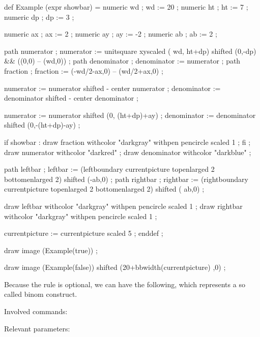 \startlinecorrection
\startMPcode
    def Example (expr showbar) =
        numeric wd ; wd := 20 ;
        numeric ht ; ht :=  7 ;
        numeric dp ; dp :=  3 ;

        numeric ax ; ax :=  2 ;
        numeric ay ; ay := -2 ;
        numeric ab ; ab :=  2 ;

        path numerator   ; numerator   := unitsquare xyscaled ( wd, ht+dp) shifted (0,-dp) && ((0,0) -- (wd,0)) ;
        path denominator ; denominator := numerator ;
        path fraction    ; fraction    := (-wd/2-ax,0) -- (wd/2+ax,0) ;

        numerator   := numerator   shifted - center numerator ;
        denominator := denominator shifted - center denominator ;

        numerator   := numerator   shifted (0, (ht+dp)+ay) ;
        denominator := denominator shifted (0,-(ht+dp)-ay) ;

        if showbar :
            draw fraction    withcolor "darkgray" withpen pencircle scaled 1 ;
        fi ;
        draw numerator   withcolor "darkred"  ;
        draw denominator withcolor "darkblue" ;

        path leftbar  ; leftbar  := (leftboundary  currentpicture topenlarged 2 bottomenlarged 2) shifted (-ab,0) ;
        path rightbar ; rightbar := (rightboundary currentpicture topenlarged 2 bottomenlarged 2) shifted ( ab,0) ;

        draw leftbar  withcolor "darkgray" withpen pencircle scaled 1 ;
        draw rightbar withcolor "darkgray" withpen pencircle scaled 1 ;

        currentpicture := currentpicture scaled 5 ;
    enddef ;

    draw image (Example(true)) ;

    draw image (Example(false)) shifted (20+bbwidth(currentpicture) ,0) ;

\stopMPcode
\stoplinecorrection

Because the rule is optional, we can have the following, which represents a so
called binom construct.

Involved commands:

\starttyping
\Uabove
\Uatop
\Uover
\Ustretched
\Uabovewithdelims
\Uatopwithdelims
\Uoverwithdelims
\Ustretchedwithdelims
\stoptyping

Relevant parameters:

\starttyping
\Umathfractionrule
\Umathfractionnumvgap
\Umathfractionnumup
\Umathfractiondenomvgap
\Umathfractiondenomdown
\Umathfractiondelsize
\stoptyping


